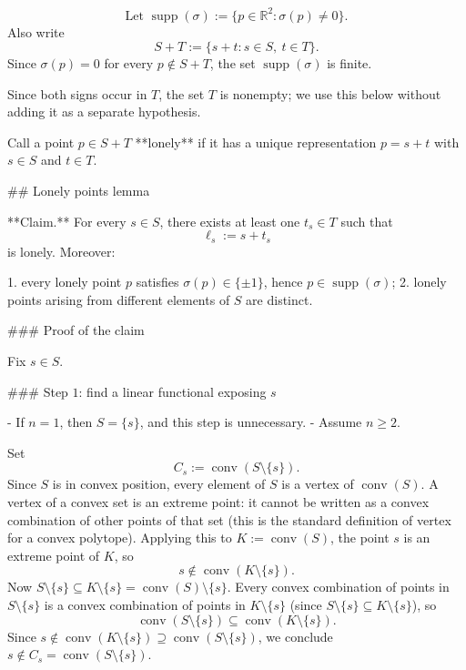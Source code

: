 \[
\text{Let } \operatorname{supp}(\sigma):=\{p\in\mathbb{R}^2:\sigma(p)\neq 0\}.
\]
Also write
\[
S+T:=\{s+t:s\in S,\ t\in T\}.
\]
Since \(\sigma(p)=0\) for every \(p\notin S+T\), the set \(\operatorname{supp}(\sigma)\) is finite.

Since both signs occur in \(T\), the set \(T\) is nonempty; we use this below without adding it as a separate hypothesis.

Call a point \(p\in S+T\) **lonely** if it has a unique representation \(p=s+t\) with \(s\in S\) and \(t\in T\).

## Lonely points lemma

**Claim.** For every \(s\in S\), there exists at least one \(t_s\in T\) such that
\[
\ell_s:=s+t_s
\]
is lonely. Moreover:

1. every lonely point \(p\) satisfies \(\sigma(p)\in\{\pm 1\}\), hence \(p\in\operatorname{supp}(\sigma)\);
2. lonely points arising from different elements of \(S\) are distinct.

### Proof of the claim

Fix \(s\in S\).

### Step \(1\): find a linear functional exposing \(s\)

- If \(n=1\), then \(S=\{s\}\), and this step is unnecessary.
- Assume \(n\ge 2\).

Set
\[
C_s:=\operatorname{conv}(S\setminus\{s\}).
\]
Since \(S\) is in convex position, every element of \(S\) is a vertex of \(\operatorname{conv}(S)\). A vertex of a convex set is an extreme point: it cannot be written as a convex combination of other points of that set (this is the standard definition of vertex for a convex polytope). Applying this to \(K:=\operatorname{conv}(S)\), the point \(s\) is an extreme point of \(K\), so
\[
s\notin \operatorname{conv}(K\setminus\{s\}).
\]
Now \(S\setminus\{s\}\subseteq K\setminus\{s\}=\operatorname{conv}(S)\setminus\{s\}\). Every convex combination of points in \(S\setminus\{s\}\) is a convex combination of points in \(K\setminus\{s\}\) (since \(S\setminus\{s\}\subseteq K\setminus\{s\}\)), so
\[
\operatorname{conv}(S\setminus\{s\})\subseteq\operatorname{conv}(K\setminus\{s\}).
\]
Since \(s\notin\operatorname{conv}(K\setminus\{s\})\supseteq\operatorname{conv}(S\setminus\{s\})\), we conclude \(s\notin C_s=\operatorname{conv}(S\setminus\{s\})\).

